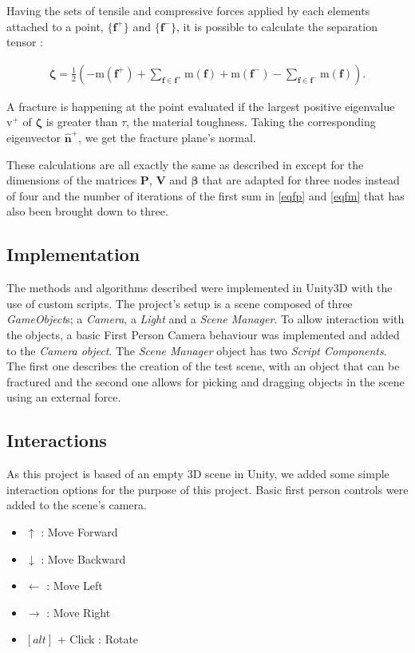 \documentclass[tog]{acmsiggraph}
\begin{document}
Having the sets of tensile and compressive forces applied by each elements attached to a point, $\{\pmb{f}^+\}$ and $\{\pmb{f}^-\}$, it is possible to calculate the separation tensor :

\begin{gather}
\pmb{\zeta} = \frac{1}{2}\left(-\pmb{\mathrm{m}}(\pmb{f}^+) + \sum_{\pmb{f} \in {\pmb{f}^+}} \pmb{\mathrm{m}}(\pmb{f}) +\pmb{\mathrm{m}}(\pmb{f}^-) - \sum_{\pmb{f} \in {\pmb{f}^-}} \pmb{\mathrm{m}}(\pmb{f}) \right).
\end{gather}

A fracture is happening at the point evaluated if the largest positive eigenvalue $\mathrm{v}^+$ of $\pmb{\zeta}$ is greater than $\tau$, the material toughness. Taking the corresponding eigenvector $\mathrm{\pmb{\hat{n}}}^+$, we get the fracture plane's normal.

These calculations are all exactly the same as described in \cite{Obrien:1999:GMA} except for the dimensions of the matrices $\pmb{P}$, $\pmb{V}$ and $\pmb{\beta}$ that are adapted for three nodes instead of four and the number of iterations of the first sum in \eqref{eqfp} and \eqref{eqfm} that has also been brought down to three. 

\subsection{Implementation}
The methods and algorithms described were implemented in Unity3D with the use of custom scripts. The project's setup is a scene composed of three \textit{GameObject}s; a \textit{Camera}, a \textit{Light} and a \textit{Scene Manager}. To allow interaction with the objects, a basic First Person Camera behaviour was implemented and added to the \textit{Camera object}. The \textit{Scene Manager} object has two \textit{Script Components}. The first one describes the creation of the test scene, with an object that can be fractured and the second one allows for picking and dragging objects in the scene using an external force. 

\subsection{Interactions}
As this project is based of an empty 3D scene in Unity, we added some simple interaction options for the purpose of this project. Basic first person controls were added to the scene's camera. 

\begin{itemize}
\setlength\itemsep{0em}
\item $\uparrow$ : Move Forward
\item $\downarrow$ : Move Backward
\item $\leftarrow$ : Move Left
\item $\rightarrow$ : Move Right
\item $\left[alt\right]$ + Click : Rotate 
\end{itemize}
\end{document}
